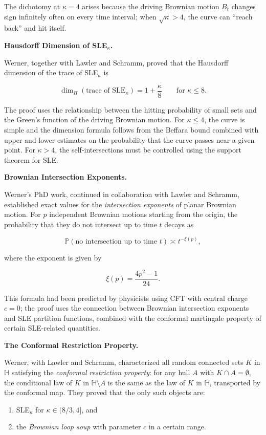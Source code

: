 The dichotomy at $\kappa = 4$ arises because the driving Brownian motion $B_t$ changes sign infinitely often on every time interval; when $\sqrt{\kappa} > 4$, the curve can ``reach back'' and hit itself.

\textbf{Hausdorff Dimension of SLE$_\kappa$.}

Werner, together with Lawler and Schramm, proved that the Hausdorff dimension of the trace of SLE$_\kappa$ is

\[
\dim_H(\text{trace of SLE}_\kappa) = 1 + \frac{\kappa}{8} \qquad \text{for } \kappa \leq 8.
\]

The proof uses the relationship between the hitting probability of small sets and the Green's function of the driving Brownian motion. For $\kappa \leq 4$, the curve is simple and the dimension formula follows from the Beffara bound combined with upper and lower estimates on the probability that the curve passes near a given point. For $\kappa > 4$, the self-intersections must be controlled using the support theorem for SLE.

\textbf{Brownian Intersection Exponents.}

Werner's PhD work, continued in collaboration with Lawler and Schramm, established exact values for the \emph{intersection exponents} of planar Brownian motion. For $p$ independent Brownian motions starting from the origin, the probability that they do not intersect up to time $t$ decays as

\[
\mathbb{P}(\text{no intersection up to time } t) \asymp t^{-\xi(p)},
\]

where the exponent is given by

\[
\xi(p) = \frac{4p^2 - 1}{24}.
\]

This formula had been predicted by physicists using CFT with central charge $c = 0$; the proof uses the connection between Brownian intersection exponents and SLE partition functions, combined with the conformal martingale property of certain SLE-related quantities.

\textbf{The Conformal Restriction Property.}

Werner, with Lawler and Schramm, characterized all random connected sets $K$ in $\mathbb{H}$ satisfying the \emph{conformal restriction property}: for any hull $A$ with $K \cap A = \emptyset$, the conditional law of $K$ in $\mathbb{H} \setminus A$ is the same as the law of $K$ in $\mathbb{H}$, transported by the conformal map. They proved that the only such objects are:

\begin{enumerate}
  \item SLE$_\kappa$ for $\kappa \in (8/3, 4]$, and
  \item the \emph{Brownian loop soup} with parameter $c$ in a certain range.
\end{enumerate}

